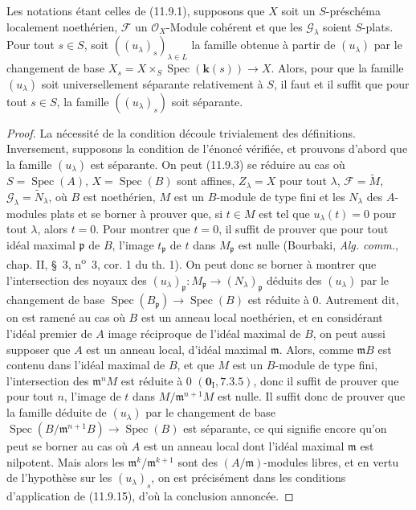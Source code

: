 \begin{theorem}[11.9.16]
\label{IV.11.9.16-fr}
Les notations étant celles de \textup{(11.9.1)}, supposons que $X$ soit un
$S$-préschéma localement noethérien, $\mathcal F$ un $\mathcal O_X$-Module
cohérent et que les $\mathcal G_\lambda$ soient $S$-plats. Pour tout $s\in S$,
soit $((u_\lambda)_s)_{\lambda\in L}$ la famille obtenue à partir de
$(u_\lambda)$ par le changement de base
$X_s=X\times_S\operatorname{Spec}(\boldsymbol{k}(s))\to X$. Alors, pour que la famille
$(u_\lambda)$ soit universellement séparante relativement à $S$, il faut et il
suffit que pour tout $s\in S$, la famille $((u_\lambda)_s)$ soit séparante.
\end{theorem}

\begin{proof}
La nécessité de la condition découle trivialement des définitions.
Inversement, supposons la condition de l'énoncé vérifiée, et prouvons d'abord
que la famille $(u_\lambda)$ est séparante. On peut (11.9.3) se réduire au cas
où $S=\operatorname{Spec}(A)$, $X=\operatorname{Spec}(B)$ sont affines,
$Z_\lambda=X$ pour tout $\lambda$, $\mathcal F=\widetilde M$,
$\mathcal G_\lambda=\widetilde N_\lambda$, où $B$ est noethérien, $M$ est un
$B$-module de type fini et les $N_\lambda$ des $A$-modules plats et se borner à
prouver que, si $t\in M$ est tel que $u_\lambda(t)=0$ pour tout $\lambda$,
alors $t=0$. Pour montrer que $t=0$, il suffit de prouver que pour tout idéal
maximal $\mathfrak p$ de $B$, l'image $t_\mathfrak p$ de $t$ dans
$M_\mathfrak p$ est nulle (Bourbaki, \emph{Alg. comm.}, chap. II, \S~3,
n\textsuperscript{o}~3, cor. 1 du th. 1). On peut donc se borner à montrer que
l'intersection
des noyaux des
$(u_\lambda)_\mathfrak p:M_\mathfrak p\to(N_\lambda)_\mathfrak p$ déduits
des $(u_\lambda)$ par le changement de base
$\operatorname{Spec}(B_\mathfrak p)\to\operatorname{Spec}(B)$ est réduite à
0. Autrement dit, on est ramené au cas où $B$ est un anneau local noethérien,
et en considérant l'idéal premier de $A$ image réciproque de l'idéal maximal de
$B$, on peut aussi supposer que $A$ est un anneau local, d'idéal maximal
$\mathfrak m$. Alors, comme $\mathfrak mB$ est contenu dans l'idéal maximal de
$B$, et que $M$ est un $B$-module de type fini, l'intersection des
$\mathfrak m^nM$ est réduite à 0 $(\mathbf 0_{\mathrm I},7.3.5)$, donc il
suffit de prouver que pour tout $n$, l'image de $t$ dans
$M/\mathfrak m^{n+1}M$ est nulle. Il suffit donc de prouver que la famille
déduite de $(u_\lambda)$ par le changement de base
$\operatorname{Spec}(B/\mathfrak m^{n+1}B)\to\operatorname{Spec}(B)$ est
séparante, ce qui signifie encore qu'on peut se borner au cas où $A$ est un
anneau local dont l'idéal maximal $\mathfrak m$ est nilpotent. Mais alors les
$\mathfrak m^k/\mathfrak m^{k+1}$ sont des $(A/\mathfrak m)$-modules libres,
et en vertu de l'hypothèse sur les $(u_\lambda)_s$, on est précisément dans les
conditions d'application de (11.9.15), d'où la conclusion annoncée.


\end{proof}
